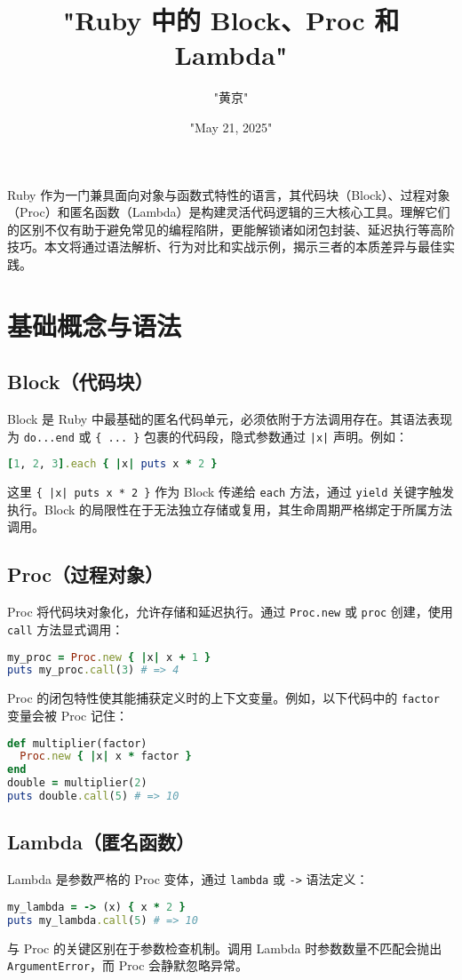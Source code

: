 \title{"Ruby 中的 Block、Proc 和 Lambda"}
\author{"黄京"}
\date{"May 21, 2025"}
\maketitle
Ruby 作为一门兼具面向对象与函数式特性的语言，其代码块（Block）、过程对象（Proc）和匿名函数（Lambda）是构建灵活代码逻辑的三大核心工具。理解它们的区别不仅有助于避免常见的编程陷阱，更能解锁诸如闭包封装、延迟执行等高阶技巧。本文将通过语法解析、行为对比和实战示例，揭示三者的本质差异与最佳实践。\par
\chapter{基础概念与语法}
\section{Block（代码块）}
Block 是 Ruby 中最基础的匿名代码单元，必须依附于方法调用存在。其语法表现为 \verb!do...end! 或 \verb!{ ... }! 包裹的代码段，隐式参数通过 \verb!|x|! 声明。例如：\par
\begin{lstlisting}[language=ruby]
[1, 2, 3].each { |x| puts x * 2 }
\end{lstlisting}
这里 \verb!{ |x| puts x * 2 }! 作为 Block 传递给 \verb!each! 方法，通过 \verb!yield! 关键字触发执行。Block 的局限性在于无法独立存储或复用，其生命周期严格绑定于所属方法调用。\par
\section{Proc（过程对象）}
Proc 将代码块对象化，允许存储和延迟执行。通过 \verb!Proc.new! 或 \verb!proc! 创建，使用 \verb!call! 方法显式调用：\par
\begin{lstlisting}[language=ruby]
my_proc = Proc.new { |x| x + 1 }
puts my_proc.call(3) # => 4
\end{lstlisting}
Proc 的闭包特性使其能捕获定义时的上下文变量。例如，以下代码中的 \verb!factor! 变量会被 Proc 记住：\par
\begin{lstlisting}[language=ruby]
def multiplier(factor)
  Proc.new { |x| x * factor }
end
double = multiplier(2)
puts double.call(5) # => 10
\end{lstlisting}
\section{Lambda（匿名函数）}
Lambda 是参数严格的 Proc 变体，通过 \verb!lambda! 或 \verb!->! 语法定义：\par
\begin{lstlisting}[language=ruby]
my_lambda = -> (x) { x * 2 }
puts my_lambda.call(5) # => 10
\end{lstlisting}
与 Proc 的关键区别在于参数检查机制。调用 Lambda 时参数数量不匹配会抛出 \verb!ArgumentError!，而 Proc 会静默忽略异常。\par
